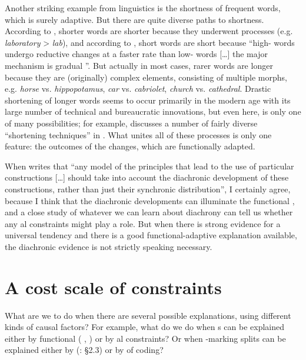 \documentclass[output=paper]{langsci/langscibook}
\begin{document}
Another striking example from linguistics is the shortness of frequent words, which is surely adaptive. But there are quite diverse paths to shortness. According to \citet{Zipf1935}, shorter words are shorter because they underwent  processes (e.g. \textit{laboratory} > \textit{lab}), and according to \citet[12]{Bybee2007}, short words are short because “high- words undergo reductive changes at a faster rate than low- words […] the major mechanism is gradual ”. But actually in most cases, rarer words are longer because they are (originally) complex elements, consisting of multiple morphs, e.g. \textit{horse} vs. \textit{hippopotamus}, \textit{car} vs. \textit{cabriolet}, \textit{church} vs. \textit{cathedral}. Drastic shortening of longer words seems to occur primarily in the modern age with its large number of technical and bureaucratic innovations, but even here,  is only one of many possibilities; for example, \citet{RonnebergerSibold2014} discusses a number of fairly diverse “shortening techniques” in . What unites all of these processes is only one feature: the outcomes of the changes, which are functionally adapted.

When \citet[297]{Cristofaro2014} writes that “any model of the principles that lead to the use of particular constructions […] should take into account the diachronic development of these constructions, rather than just their synchronic distribution”, I certainly agree, because I think that the diachronic developments can illuminate the functional , and a close study of whatever we can learn about diachrony can tell us whether any al constraints might play a role. But when there is strong evidence for a universal tendency and there is a good functional-adaptive explanation available, the diachronic evidence is not strictly speaking necessary.\label{p:haspelmath:strictlyspeakingnecessary}

\section{A cost scale of constraints}\label{sec:haspelmath:7}

What are we to do when there are several possible explanations, using different kinds of causal factors? For example, what do we do when s can be explained either by functional  ( , \citealt{Hawkins2014_VarEff}) or by al constraints? Or when -marking splits can be explained either by  (\citealt{Kiparsky2008}: §2.3) or by  of coding?
\end{document}
